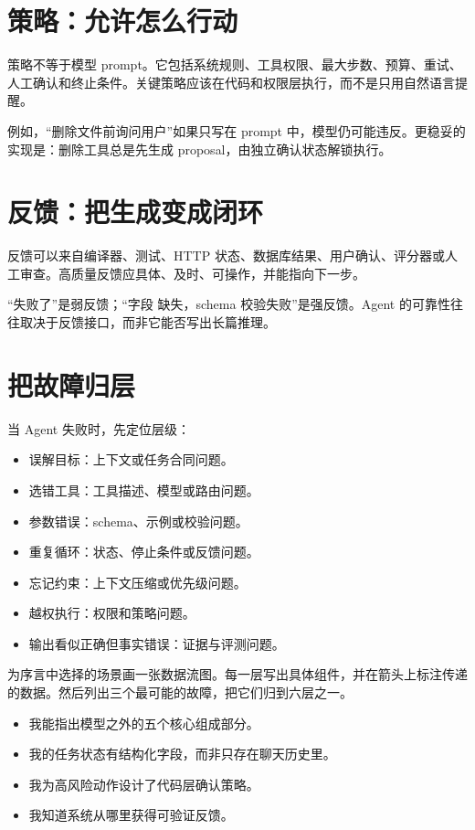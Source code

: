 \section{策略：允许怎么行动}

策略不等于模型 prompt。它包括系统规则、工具权限、最大步数、预算、重试、人工确认和终止条件。关键策略应该在代码和权限层执行，而不是只用自然语言提醒。

例如，“删除文件前询问用户”如果只写在 prompt 中，模型仍可能违反。更稳妥的实现是：删除工具总是先生成 proposal，由独立确认状态解锁执行。

\section{反馈：把生成变成闭环}

反馈可以来自编译器、测试、HTTP 状态、数据库结果、用户确认、评分器或人工审查。高质量反馈应具体、及时、可操作，并能指向下一步。

“失败了”是弱反馈；“字段  缺失，schema 校验失败”是强反馈。Agent 的可靠性往往取决于反馈接口，而非它能否写出长篇推理。

\section{把故障归层}

当 Agent 失败时，先定位层级：

\begin{itemize}
  \item 误解目标：上下文或任务合同问题。
  \item 选错工具：工具描述、模型或路由问题。
  \item 参数错误：schema、示例或校验问题。
  \item 重复循环：状态、停止条件或反馈问题。
  \item 忘记约束：上下文压缩或优先级问题。
  \item 越权执行：权限和策略问题。
  \item 输出看似正确但事实错误：证据与评测问题。
\end{itemize}

\begin{practice}[画出你的六层图]
为序言中选择的场景画一张数据流图。每一层写出具体组件，并在箭头上标注传递的数据。然后列出三个最可能的故障，把它们归到六层之一。
\end{practice}

\begin{checkpoint}
\begin{itemize}
  \item \checkbox 我能指出模型之外的五个核心组成部分。
  \item \checkbox 我的任务状态有结构化字段，而非只存在聊天历史里。
  \item \checkbox 我为高风险动作设计了代码层确认策略。
  \item \checkbox 我知道系统从哪里获得可验证反馈。
\end{itemize}
\end{checkpoint}

